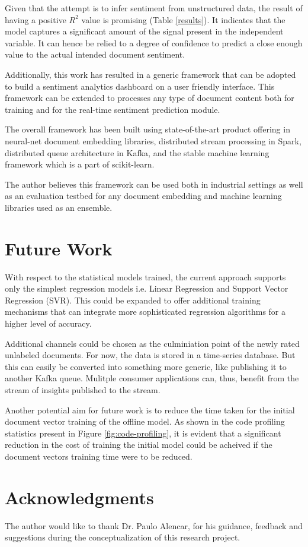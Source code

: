 \documentclass[conference]{IEEEtran}
\begin{document}
Given that the attempt is to infer sentiment from unstructured data, the result of having a positive $R^2$ value is promising (Table \ref{results}).
It indicates that the model captures a significant amount of the signal present in the independent variable.
It can hence be relied to a degree of confidence to predict a close enough value to the actual intended document sentiment.

Additionally, this work has resulted in a generic framework that can be adopted to build a sentiment analytics dashboard on a user friendly interface. 
This framework can be extended to processes any type of document content both for training and for the real-time sentiment prediction module.

The overall framework has been built using state-of-the-art product offering in neural-net document embedding libraries, distributed stream processing in Spark, distributed queue architecture in Kafka, and the stable machine learning framework which is a part of scikit-learn. 

The author believes this framework can be used both in industrial settings as well as an evaluation testbed for any document embedding and machine learning libraries used as an ensemble.

\vspace{5mm}

\section{Future Work}
With respect to the statistical models trained, the current approach supports only the simplest regression models i.e. Linear Regression and Support Vector Regression (SVR). 
This could be expanded to offer additional training mechanisms that can integrate more sophisticated regression algorithms for a higher level of accuracy.
 
Additional channels could be chosen as the culminiation point of the newly rated unlabeled documents.
For now, the data is stored in a time-series database.
But this can easily be converted into something more generic, like publishing it to another Kafka queue.
Mulitple consumer applications can, thus, benefit from the stream of insights published to the stream.

Another potential aim for future work is to reduce the time taken for the initial document vector training of the offline model.
As shown in the code profiling statistics present in Figure \ref{fig:code-profiling}, it is evident that a significant reduction in the cost of training the initial model could be acheived if the document vectors training time were to be reduced.

\vspace{5mm}

\section{Acknowledgments}
The author would like to thank Dr. Paulo Alencar, for his guidance, feedback and suggestions during the conceptualization of this research project.

\vspace{5mm}



\end{document}
